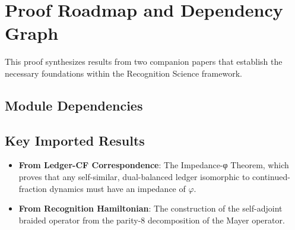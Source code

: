 \documentclass[11pt,a4paper]{article}
\theoremstyle{definition}
\theoremstyle{remark}
\begin{document}
\section{Proof Roadmap and Dependency Graph}\label{sec:roadmap}

This proof synthesizes results from two companion papers that establish the necessary foundations within the Recognition Science framework.

\subsection{Module Dependencies}

\begin{center}
\end{center}

\subsection{Key Imported Results}

\begin{itemize}
\item \textbf{From Ledger-CF Correspondence}: The Impedance-φ Theorem, which proves that any self-similar, dual-balanced ledger isomorphic to continued-fraction dynamics must have an impedance of $\varphi$.
\item \textbf{From Recognition Hamiltonian}: The construction of the self-adjoint braided operator from the parity-8 decomposition of the Mayer operator.
\end{itemize}
\end{document}
